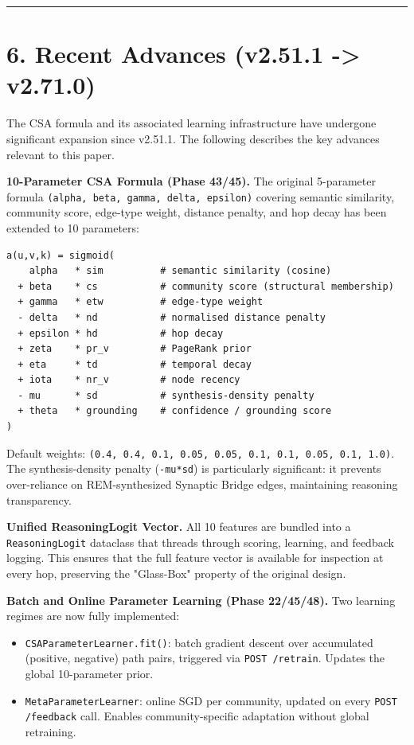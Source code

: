 \medskip\noindent\rule{\linewidth}{0.4pt}\medskip

\section*{6. Recent Advances (v2.51.1 -> v2.71.0)}

The CSA formula and its associated learning infrastructure have undergone significant expansion since v2.51.1. The following describes the key advances relevant to this paper.

\textbf{10-Parameter CSA Formula (Phase 43/45).} The original 5-parameter formula \texttt{(alpha, beta, gamma, delta, epsilon)} covering semantic similarity, community score, edge-type weight, distance penalty, and hop decay has been extended to 10 parameters:

\begin{lstlisting}
a(u,v,k) = sigmoid(
    alpha   * sim          # semantic similarity (cosine)
  + beta    * cs           # community score (structural membership)
  + gamma   * etw          # edge-type weight
  - delta   * nd           # normalised distance penalty
  + epsilon * hd           # hop decay
  + zeta    * pr_v         # PageRank prior
  + eta     * td           # temporal decay
  + iota    * nr_v         # node recency
  - mu      * sd           # synthesis-density penalty
  + theta   * grounding    # confidence / grounding score
)
\end{lstlisting}

Default weights: \texttt{(0.4, 0.4, 0.1, 0.05, 0.05, 0.1, 0.1, 0.05, 0.1, 1.0)}. The synthesis-density penalty (\texttt{-mu*sd}) is particularly significant: it prevents over-reliance on REM-synthesized Synaptic Bridge edges, maintaining reasoning transparency.

\textbf{Unified ReasoningLogit Vector.} All 10 features are bundled into a \texttt{ReasoningLogit} dataclass that threads through scoring, learning, and feedback logging. This ensures that the full feature vector is available for inspection at every hop, preserving the "Glass-Box" property of the original design.

\textbf{Batch and Online Parameter Learning (Phase 22/45/48).} Two learning regimes are now fully implemented:
\begin{itemize}
  \item \texttt{CSAParameterLearner.fit()}: batch gradient descent over accumulated (positive, negative) path pairs, triggered via \texttt{POST /retrain}. Updates the global 10-parameter prior.
  \item \texttt{MetaParameterLearner}: online SGD per community, updated on every \texttt{POST /feedback} call. Enables community-specific adaptation without global retraining.
\end{itemize}


